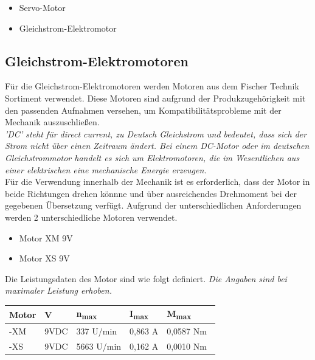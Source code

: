 \documentclass[conference,compsoc,final,a4paper]{IEEEtran}
\begin{document}
\begin{itemize}
	\item Servo-Motor
	\item Gleichstrom-Elektromotor
\end{itemize}

\subsection{Gleichstrom-Elektromotoren}
\noindent Für die Gleichstrom-Elektromotoren werden Motoren aus dem Fischer Technik Sortiment verwendet. 
Diese Motoren sind aufgrund der Produkzugehörigkeit mit den passenden Aufnahmen versehen, um Kompatibilitätsprobleme mit der Mechanik auszuschließen.
\\


\textit{’DC’ steht für direct current, zu Deutsch Gleichstrom und bedeutet, dass sich der Strom nicht über einen Zeitraum ändert. Bei einem DC-Motor oder im deutschen Gleichstrommotor handelt es sich um Elektromotoren, die im Wesentlichen aus
einer elektrischen eine mechanische Energie erzeugen.} \autocite{metzgerkonzepte}
\\


\noindent Für die Verwendung innerhalb der Mechanik ist es erforderlich, dass der Motor in beide Richtungen drehen könnne und über ausreichendes Drehmoment bei der gegebenen Übersetzung verfügt.
Aufgrund der unterschiedlichen Anforderungen werden 2 unterschiedliche Motoren verwendet.
\begin{itemize}
\item Motor XM 9V
\item Motor XS 9V
\end{itemize}

\noindent Die Leistungsdaten des Motor sind wie folgt definiert. 
\newline \textit{Die Angaben sind bei maximaler Leistung erhoben.}

\begin{table}[h]\begin{tabular}{lllll}
    \textbf{Motor} & \textbf{V} & \textbf{n\textsubscript{max}} & \textbf{I\textsubscript{max}} & \textbf{M\textsubscript{max}} \\ \hline
  -XM\autocite{motorenXM} & 9VDC & 337 U/min  & 0,863 A & 0,0587 Nm  \\ 
  -XS\autocite{motorenXS} & 9VDC & 5663 U/min & 0,162 A & 0,0010 Nm  \\
\end{tabular}\end{table}
\end{document}
